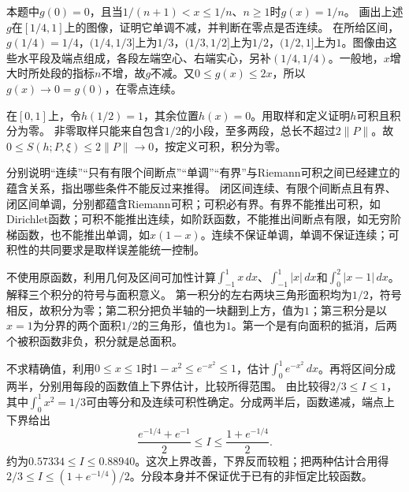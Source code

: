 本题中\(g(0)=0\)，且当\(1/(n+1)<x\le1/n\)、\(n\ge1\)时\(g(x)=1/n\)。
画出上述\(g\)在\([1/4,1]\)上的图像，证明它单调不减，并判断在零点是否连续。
\solutionanswer
在所给区间，\(g(1/4)=1/4\)，\((1/4,1/3]\)上为\(1/3\)，\((1/3,1/2]\)上为\(1/2\)，\((1/2,1]\)上为\(1\)。图像由这些水平段及端点组成，各段左端空心、右端实心，另补\((1/4,1/4)\)。一般地，\(x\)增大时所处段的指标\(n\)不增，故\(g\)不减。又\(0\le g(x)\le2x\)，所以\(g(x)\to0=g(0)\)，在零点连续。
\begin{center}\end{center}


在\([0,1]\)上，令\(h(1/2)=1\)，其余位置\(h(x)=0\)。用取样和定义证明\(h\)可积且积分为零。
\solutionanswer
非零取样只能来自包含\(1/2\)的小段，至多两段，总长不超过\(2\|P\|\)。故\(0\le S(h;P,\xi)\le2\|P\|\to0\)，按定义可积，积分为零。


分别说明“连续”“只有有限个间断点”“单调”“有界”与Riemann可积之间已经建立的蕴含关系，指出哪些条件不能反过来推得。
\solutionanswer
闭区间连续、有限个间断点且有界、闭区间单调，分别都蕴含Riemann可积；可积必有界。有界不能推出可积，如Dirichlet函数；可积不能推出连续，如阶跃函数，不能推出间断点有限，如无穷阶梯函数，也不能推出单调，如\(x(1-x)\)。连续不保证单调，单调不保证连续；可积性的共同要求是取样误差能统一控制。


不使用原函数，利用几何及区间可加性计算\(\int_{-1}^1x\,dx\)、\(\int_{-1}^1|x|\,dx\)和\(\int_0^2|x-1|\,dx\)。解释三个积分的符号与面积意义。
\solutionanswer
第一积分的左右两块三角形面积均为\(1/2\)，符号相反，故积分为零；第二积分把负半轴的一块翻到上方，值为\(1\)；第三积分是以\(x=1\)为分界的两个面积\(1/2\)的三角形，值也为\(1\)。第一个是有向面积的抵消，后两个被积函数非负，积分就是总面积。


不求精确值，利用\(0\le x\le1\)时\(1-x^2\le e^{-x^2}\le1\)，估计\(\int_0^1 e^{-x^2}\,dx\)。再将区间分成两半，分别用每段的函数值上下界估计，比较所得范围。
\solutionanswer
由比较得\(2/3\le I\le1\)，其中\(\int_0^1x^2=1/3\)可由等分和及连续可积性确定。分成两半后，函数递减，端点上下界给出
\[
 \frac{e^{-1/4}+e^{-1}}2\le I\le\frac{1+e^{-1/4}}2.
\]
约为\(0.57334\le I\le0.88940\)。这次上界改善，下界反而较粗；把两种估计合用得\(2/3\le I\le(1+e^{-1/4})/2\)。分段本身并不保证优于已有的非恒定比较函数。



